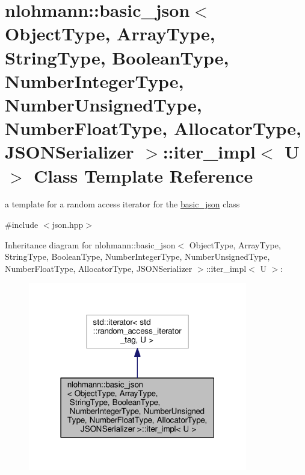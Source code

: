 \hypertarget{classnlohmann_1_1basic__json_1_1iter__impl}{}\section{nlohmann\+:\+:basic\+\_\+json$<$ Object\+Type, Array\+Type, String\+Type, Boolean\+Type, Number\+Integer\+Type, Number\+Unsigned\+Type, Number\+Float\+Type, Allocator\+Type, J\+S\+O\+N\+Serializer $>$\+:\+:iter\+\_\+impl$<$ U $>$ Class Template Reference}
\label{classnlohmann_1_1basic__json_1_1iter__impl}


a template for a random access iterator for the \hyperlink{classnlohmann_1_1basic__json}{basic\+\_\+json} class  




{\ttfamily \#include $<$json.\+hpp$>$}



Inheritance diagram for nlohmann\+:\+:basic\+\_\+json$<$ Object\+Type, Array\+Type, String\+Type, Boolean\+Type, Number\+Integer\+Type, Number\+Unsigned\+Type, Number\+Float\+Type, Allocator\+Type, J\+S\+O\+N\+Serializer $>$\+:\+:iter\+\_\+impl$<$ U $>$\+:\nopagebreak
\begin{figure}[H]
\begin{center}
\leavevmode
\includegraphics[width=271pt]{classnlohmann_1_1basic__json_1_1iter__impl__inherit__graph}
\end{center}
\end{figure}


